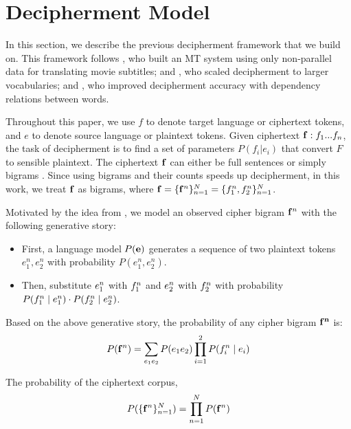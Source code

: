\section{Decipherment Model}

In this section, we describe the previous decipherment framework that we build on.  This framework follows , who built an MT system using only non-parallel data for translating movie subtitles;  and , who scaled decipherment to larger vocabularies; and , who improved decipherment accuracy with dependency relations between words. 

Throughout this paper, we use $f$ to denote target language or ciphertext tokens, and $e$ to denote source language or plaintext tokens. Given ciphertext $\mathbf{f}:f_{1}...f_{n}$, the task of decipherment is to find a set of parameters $P(f_{i}|e_{i})$ that convert $F$ to sensible plaintext. The ciphertext $\mathbf{f}$ can either be full sentences \cite{ravi-knight:2011,Nuhn:2012} or simply bigrams \cite{dou-knight:2013:EMNLP}. Since using bigrams and their counts speeds up decipherment, in this work, we treat $\mathbf{f}$ as bigrams, where $ \mathbf{f} = \{ \mathbf{f}^n \}_{n=1}^{N} = \{ f_1^n,f_2^n \}_{n=1}^{N} $. 

Motivated by the idea from , we model an observed cipher bigram $\mathbf{f}^n$ with the following generative story:

\begin{itemize}
\item  First, a language model $P(\mathbf{e})$ generates a sequence of two plaintext tokens $e_{1}^n,e_{2}^n$ with probability $P(e_{1}^n,e_{2}^n)$.
\item  Then, substitute $e_{1}^n$ with $f_{1}^n$ and $e_{2}^n$ with $f_{2}^n$ with probability $P(f_{1}^n \mid e_{1}^n) \cdot P(f_{2}^n \mid e_{2}^n)$.
\end{itemize}

Based on the above generative story, the probability of any cipher bigram $\mathbf{f^n}$ is:
%
\[
\label{p_cipher}
P(\mathbf{f}^n) =  \sum_{e_{1} e_{2}} P(e_{1}e_{2}) \prod_{i=1}^{2}P(f_{i}^n \mid e_{i})
\]
%

The probability of the ciphertext corpus,
%
\[
\label{p_corpus}
P( \{ \mathbf{f}^n \}_{n=1}^{N} ) =  \prod_{n=1}^{N} P(\mathbf{f}^{n})
\]
%

